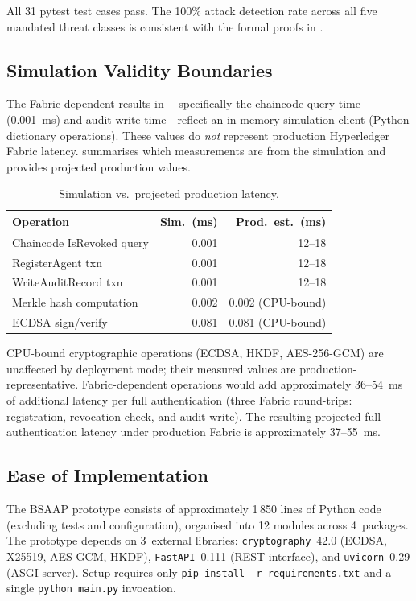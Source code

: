 \documentclass[review,5p,twocolumn,times]{elsarticle}
\begin{document}
All 31 pytest test cases pass. The 100\% attack detection rate across all
five mandated threat classes is consistent with the formal proofs
in .

\subsection{Simulation Validity Boundaries}\label{sec:simvalid}

The Fabric-dependent results in ---specifically the
chaincode query time (0.001~ms) and audit write time---reflect an
in-memory simulation client (Python dictionary operations). These values
do \emph{not} represent production Hyperledger Fabric latency.
 summarises which measurements are from the simulation
and provides projected production values.

\begin{table}[H]
\centering
\caption{Simulation vs.\ projected production latency.}
\label{tab:simbound}
\small
\begin{tabular}{@{}lrr@{}}
\toprule
\textbf{Operation} & \textbf{Sim.\ (ms)} & \textbf{Prod.\ est.\ (ms)}\\
\midrule
Chaincode IsRevoked query & 0.001 & 12--18\\
RegisterAgent txn         & 0.001 & 12--18\\
WriteAuditRecord txn      & 0.001 & 12--18\\
Merkle hash computation   & 0.002 & 0.002 (CPU-bound)\\
ECDSA sign/verify         & 0.081 & 0.081 (CPU-bound)\\
\bottomrule
\end{tabular}
\end{table}

CPU-bound cryptographic operations (ECDSA, HKDF, AES-256-GCM) are
unaffected by deployment mode; their measured values are production-representative.
Fabric-dependent operations would add approximately 36--54~ms of additional
latency per full authentication (three Fabric round-trips: registration,
revocation check, and audit write). The resulting projected full-authentication
latency under production Fabric is approximately 37--55~ms.

\subsection{Ease of Implementation}\label{sec:ease}

The BSAAP prototype consists of approximately 1\,850 lines of Python code
(excluding tests and configuration), organised into 12 modules across
4~packages. The prototype depends on 3~external libraries:
\texttt{cryptography}~42.0 (ECDSA, X25519, AES-GCM, HKDF),
\texttt{FastAPI}~0.111 (REST interface), and \texttt{uvicorn}~0.29
(ASGI server). Setup requires only \texttt{pip install -r requirements.txt}
and a single \texttt{python main.py} invocation.
\end{document}
